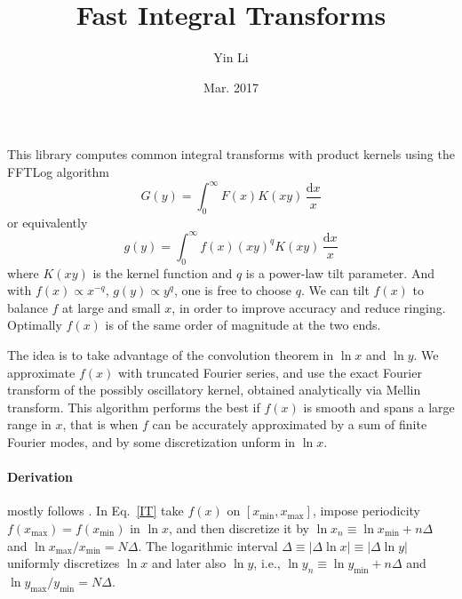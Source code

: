 \documentclass{article}
\renewcommand{\d}{\mathrm{d}}
\newcommand{\xmin}{x_\textrm{min}}
\newcommand{\xmax}{x_\textrm{max}}
\newcommand{\ymin}{y_\textrm{min}}
\newcommand{\ymax}{y_\textrm{max}}
\begin{document}
\title{Fast Integral Transforms}
\author{Yin Li}
\date{Mar. 2017}
\maketitle


This library computes common integral transforms
with product kernels using the FFTLog algorithm \cite{Talman78,Hamilton00}
\begin{equation}
    \label{IT}
    G(y) = \int_0^\infty F(x) K(xy) \,\frac{\d x}x
\end{equation}
or equivalently
\begin{equation}
    \label{IT}
    g(y) = \int_0^\infty f(x) (xy)^q K(xy) \,\frac{\d x}x
\end{equation}
where $K(xy)$ is the kernel function and $q$ is a power-law tilt parameter.
And with $f(x)\propto x^{-q}$, $g(y)\propto y^q$, one is free to choose $q$.
We can tilt $f(x)$ to balance $f$ at large and small $x$,
in order to improve accuracy and reduce ringing.
Optimally $f(x)$ is of the same order of magnitude at the two ends.

The idea is to take advantage of the convolution theorem in $\ln x$ and $\ln y$.
We approximate $f(x)$ with truncated Fourier series,
and use the exact Fourier transform of the possibly oscillatory kernel,
obtained analytically via Mellin transform.
This algorithm performs the best if $f(x)$ is smooth and spans a large range
in $x$, that is when $f$ can be accurately approximated by a sum of finite Fourier modes,
and by some discretization unform in $\ln x$.


\paragraph{Derivation} mostly follows \cite{Hamilton00}.
In Eq.~\eqref{IT} take $f(x)$ on $[\xmin, \xmax]$, impose periodicity
$f(\xmax)=f(\xmin)$ in $\ln x$, and then discretize it by
$\ln x_n\equiv\ln\xmin+n\Delta$ and $\ln\xmax/\xmin=N\Delta$.
The logarithmic interval $\Delta\equiv|\Delta\ln x|\equiv|\Delta\ln y|$
uniformly discretizes $\ln x$ and later also $\ln y$,
i.e., $\ln y_n\equiv\ln\ymin+n\Delta$ and $\ln\ymax/\ymin=N\Delta$.
\end{document}
